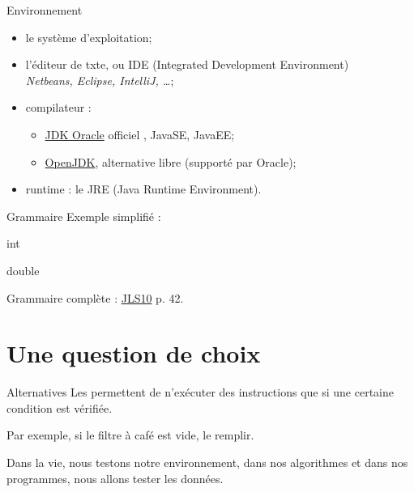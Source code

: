\begin{hideedit}
\begin{frame}{Environnement}
  \begin{itemize}
    \item le système d'exploitation;
    \item l'éditeur de txte, ou IDE (Integrated Development Environment)\\
      \textit{Netbeans, Eclipse, IntelliJ, \dots};
    \item compilateur :
      \begin{itemize}
        \item
          \href{http://www.oracle.com/technetwork/java/javase/downloads}
          {JDK Oracle} \og officiel \fg, JavaSE, JavaEE;
        \item \href{http://openjdk.java.net/}{OpenJDK}, alternative libre
          (supporté par Oracle);
      \end{itemize}
    \item runtime : le JRE (Java Runtime Environment).
  \end{itemize}
\end{frame}

\begin{frame}[fragile]{Grammaire}
  Exemple simplifié :
\begin{grammaire}

    int

    double
\end{grammaire}

  Grammaire complète : \href{https://docs.oracle.com/javase/specs/jls/se10/jls10.pdf}{JLS10} p. 42.
\end{frame}

\section{Une question de choix}
\frame{\sectionpage}

\begin{frame}{Alternatives}
  Les  permettent de n’exécuter des
  instructions que si une certaine \alert{condition} est vérifiée.

  Par exemple, si le filtre à café est vide, le remplir.

  Dans la vie, nous testons notre environnement, dans nos algorithmes et
  dans nos programmes, nous allons tester les données.

\end{frame}


\end{hideedit}
